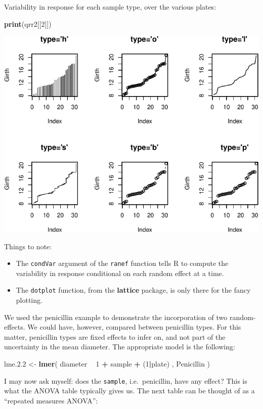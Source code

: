 \documentclass[]{book}
\newenvironment{Shaded}{\begin{snugshade}}{\end{snugshade}}
\newcommand{\DecValTok}[1]{\textcolor[rgb]{0.00,0.00,0.81}{#1}}
\newcommand{\FloatTok}[1]{\textcolor[rgb]{0.00,0.00,0.81}{#1}}
\newcommand{\KeywordTok}[1]{\textcolor[rgb]{0.13,0.29,0.53}{\textbf{#1}}}
\newcommand{\NormalTok}[1]{#1}
\newcommand{\OperatorTok}[1]{\textcolor[rgb]{0.81,0.36,0.00}{\textbf{#1}}}
\newcommand{\StringTok}[1]{\textcolor[rgb]{0.31,0.60,0.02}{#1}}
\providecommand{\tightlist}{%
  \setlength{\itemsep}{0pt}\setlength{\parskip}{0pt}}
\theoremstyle{definition}
\theoremstyle{definition}
\theoremstyle{definition}
\theoremstyle{remark}
\begin{document}
Variability in response for each sample type, over the various plates:

\begin{Shaded}
\begin{Highlighting}[]
\KeywordTok{print}\NormalTok{(qrr2[[}\DecValTok{2}\NormalTok{]])  }
\end{Highlighting}
\end{Shaded}

\includegraphics[width=0.5\linewidth]{Rcourse_files/figure-latex/unnamed-chunk-207-1}

Things to note:

\begin{itemize}
\tightlist
\item
  The \texttt{condVar} argument of the \texttt{ranef} function tells R to compute the variability in response conditional on each random effect at a time.
\item
  The \texttt{dotplot} function, from the \textbf{lattice} package, is only there for the fancy plotting.
\end{itemize}

We used the penicillin example to demonstrate the incorporation of two random-effects. We could have, however, compared between penicillin types. For this matter, penicillin types are fixed effects to infer on, and not part of the uncertainty in the mean diameter. The appropriate model is the following:

\begin{Shaded}
\begin{Highlighting}[]
\NormalTok{lme.}\FloatTok{2.2}\NormalTok{ <-}\StringTok{ }\KeywordTok{lmer}\NormalTok{( diameter }\OperatorTok{~}\StringTok{  }\DecValTok{1}  \OperatorTok{+}\StringTok{ }\NormalTok{sample }\OperatorTok{+}\StringTok{ }\NormalTok{(}\DecValTok{1}\OperatorTok{|}\NormalTok{plate) , Penicillin )}
\end{Highlighting}
\end{Shaded}

I may now ask myself: does the \texttt{sample}, i.e.~penicillin, have any effect? This is what the ANOVA table typically gives us. The next table can be thought of as a ``repeated measures ANOVA'':
\end{document}
